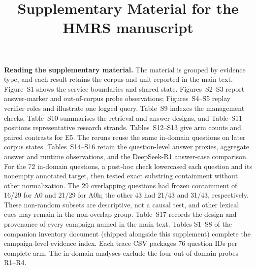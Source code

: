 \title{Supplementary Material for the HMRS manuscript}

\maketitle


\noindent\textbf{Reading the supplementary material.} The material is
grouped by evidence type, and each result retains the corpus and unit
reported in the main text. Figure~S1 shows the service boundaries and
shared state. Figures~S2--S3 report answer-marker and out-of-corpus probe
observations; Figures~S4--S5 replay verifier roles and illustrate one
logged query. Table~S9 indexes the management checks, Table~S10 summarises
the retrieval and answer designs, and Table~S11 positions representative
research strands. Tables~S12--S13 give arm counts and paired contrasts for
E5. The reruns reuse the same in-domain questions on later corpus states.
Tables~S14--S16 retain the
question-level answer proxies, aggregate answer and runtime observations,
and the DeepSeek-R1 answer-case comparison. For the 72 in-domain questions,
a post-hoc check lowercased each question and its nonempty annotated target,
then tested exact substring containment without other normalization. The
29 overlapping questions had frozen containment of 16/29 for A0 and 21/29
for A0h; the other 43 had 21/43 and 31/43, respectively. These non-random
subsets are descriptive, not a causal test, and other lexical cues may remain
in the non-overlap group. Table~S17 records the design
and provenance of every campaign named in the main text. Tables S1--S8 of
the companion inventory document (shipped alongside this supplement)
complete the campaign-level evidence index. Each trace CSV
packages 76 question IDs per complete arm. The in-domain analyses exclude the
four out-of-domain probes R1--R4.

